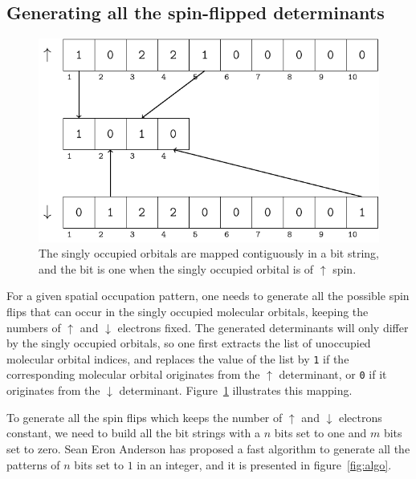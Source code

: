 \documentclass[aip,jcp,reprint,showkeys]{revtex4-1}
\newcommand{\up}{\uparrow}
\newcommand{\dn}{\downarrow}
\newcommand{\sop}{spatial occupation pattern}
\begin{document}
\subsection{Generating all the spin-flipped determinants}

\begin{figure}
\includegraphics[width=0.9\columnwidth]{mapping}
\caption{The singly occupied orbitals are mapped contiguously in a bit string,
and the bit is one when the singly occupied orbital is of $\up$ spin.}
\label{fig:mapping}
\end{figure}





For a given {\sop}, one needs to generate all the possible spin flips that can
occur in the singly occupied molecular orbitals, keeping the numbers of $\up$
and $\dn$ electrons fixed. The generated determinants will only differ by the
singly occupied orbitals,
so one first extracts the list of unoccupied molecular
orbital indices, and replaces the value of the list by 
\texttt{1} if the corresponding molecular orbital originates from the $\up$
determinant, or \texttt{0} if it originates from the $\dn$ determinant. 
Figure~\ref{fig:mapping} illustrates this mapping.

To generate all the spin flips which keeps the number of $\up$ and $\dn$
electrons constant, we need to build all the bit strings with a $n$
bits set to one and $m$ bits set to zero. %
Sean Eron Anderson\cite{NextBit} has proposed a fast algorithm to generate all
the patterns of $n$ bits set to $1$ in an integer, and it is presented in
figure~\ref{fig:algo}.
\end{document}
